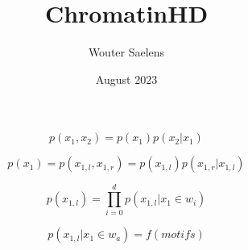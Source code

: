 \documentclass{article}
\title{ChromatinHD}
\author{Wouter Saelens}
\date{August 2023}
\begin{document}
\maketitle

\begin{equation}
    p(x_1,x_2) = p(x_1)p(x_2|x_1)
\end{equation}

\begin{equation}
    p(x_1) = p(x_{1,l},x_{1,r}) = p(x_{1,l})p(x_{1,r}|x_{1,l})
\end{equation}

\begin{equation}
    p(x_{1,l}) = \prod_{i=0}^{d} p(x_{1,l}|x_{1}\in w_i)
\end{equation}

\begin{equation}
    p(x_{1,l}|x_{1}\in w_a) = f(motifs)
\end{equation}
\end{document}

